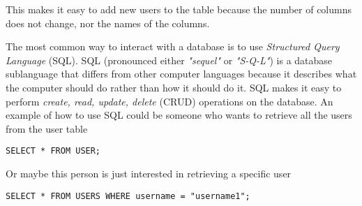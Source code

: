 This makes it easy to add new users to the table because the number of columns does not change, nor the names of the columns.

The most common way to interact with a database is to use \textit{Structured Query Language} (SQL). SQL (pronounced either \textit{"sequel"} or \textit{"S-Q-L"}) is a database sublanguage that differs from other computer languages because it describes what the computer should do rather than how it should do it. %
SQL makes it easy to perform \textit{create, read, update, delete} (CRUD) operations on the database. %
 An example of how to use SQL could be someone who wants to retrieve all the users from the user table

\begin{lstlisting}
SELECT * FROM USER;
\end{lstlisting}

Or maybe this person is just interested in retrieving a specific user

\begin{lstlisting}
SELECT * FROM USERS WHERE username = "username1";
\end{lstlisting}



